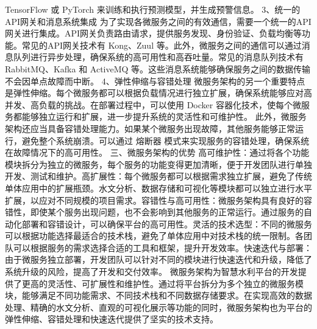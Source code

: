 {TensorFlow 或 PyTorch 来训练和执行预测模型，并生成预警信息。 3、统一的API网关和消息系统集成
为了实现各微服务之间的有效通信，需要一个统一的API网关进行集成。API网关负责路由请求，提供服务发现、身份验证、负载均衡等功能。常见的API网关技术有 Kong、Zuul
等。此外，微服务之间的通信可以通过消息队列进行异步处理，确保系统的高可用性和高吞吐量。常见的消息队列技术有 RabbitMQ、Kafka 和 ActiveMQ 等。这些消息系统能够确保服务之间的数据传输不会因单点故障而中断。
4、弹性伸缩与容错处理 微服务架构的另一个重要特点是弹性伸缩。每个微服务都可以根据负载情况进行独立扩展，确保系统能够应对高并发、高负载的挑战。在部署过程中，可以使用 Docker
容器化技术，使每个微服务都能够独立运行和扩展，进一步提升系统的灵活性和可维护性。 此外，微服务架构还应当具备容错处理能力。如果某个微服务出现故障，其他服务能够正常运行，避免整个系统崩溃。可以通过 熔断器
模式来实现服务的容错处理，确保系统在故障情况下的高可用性。 三、微服务架构的优势
高可维护性：通过将各个功能模块拆分为独立的微服务，每个服务的功能变得更加清晰，便于开发团队进行单独开发、测试和维护。高扩展性：每个微服务都可以根据需求独立扩展，避免了传统单体应用中的扩展瓶颈。水文分析、数据存储和可视化等模块都可以独立进行水平扩展，以应对不同规模的项目需求。容错性与高可用性：微服务架构具有良好的容错性，即使某个服务出现问题，也不会影响到其他服务的正常运行。通过服务的自动化部署和容错设计，可以确保平台的高可用性。灵活的技术选型：不同的微服务可以根据功能选择最适合的技术栈，避免了单体应用中对技术栈的统一限制。各团队可以根据服务的需求选择合适的工具和框架，提升开发效率。快速迭代与部署：由于微服务独立部署，开发团队可以针对不同的模块进行快速迭代和升级，降低了系统升级的风险，提高了开发和交付效率。
微服务架构为智慧水利平台的开发提供了更高的灵活性、可扩展性和维护性。通过将平台拆分为多个独立的微服务模块，能够满足不同功能需求、不同技术栈和不同数据存储要求。在实现高效的数据处理、精确的水文分析、直观的可视化展示等功能的同时，微服务架构也为平台的弹性伸缩、容错处理和快速迭代提供了坚实的技术支持。
}
